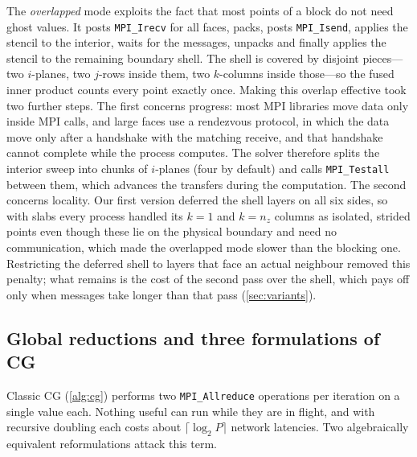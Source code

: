 \documentclass[10pt,a4paper]{article}
\newcommand{\code}[1]{\texttt{#1}}
\begin{document}
The \emph{overlapped} mode exploits the fact that most points of a block do not need ghost values. It
posts \code{MPI\_Irecv} for all faces, packs, posts \code{MPI\_Isend}, applies the stencil to the interior,
waits for the messages, unpacks and finally applies the stencil to the remaining boundary shell. The shell
is covered by disjoint pieces---two $i$-planes, two $j$-rows inside them, two $k$-columns inside those---so
the fused inner product counts every point exactly once. Making this overlap effective took two further
steps. The first concerns progress: most MPI libraries move data only inside MPI calls, and large faces
use a rendezvous protocol, in which the data move only after a handshake with the matching receive, and
that handshake cannot complete while the process computes. The solver therefore
splits the interior sweep into chunks of $i$-planes (four by default) and calls \code{MPI\_Testall}
between them, which advances the transfers during the computation. The second concerns locality. Our first
version deferred the shell layers on all six sides, so with slabs every process handled its $k=1$ and
$k=n_z$ columns as isolated, strided points even though these lie on the physical boundary and need no
communication, which made the overlapped mode slower than the blocking one.
Restricting the deferred shell to layers that face an actual neighbour removed this penalty; what remains
is the cost of the second pass over the shell, which pays off only when messages take longer than that
pass (\cref{sec:variants}).

\subsection{Global reductions and three formulations of CG}\label{sec:reductions}
Classic CG (\cref{alg:cg}) performs two \code{MPI\_Allreduce} operations per iteration on a single value
each. Nothing useful can run while they are in flight, and with recursive doubling each costs about
$\lceil\log_2P\rceil$ network latencies. Two algebraically equivalent reformulations attack this term.
\end{document}
